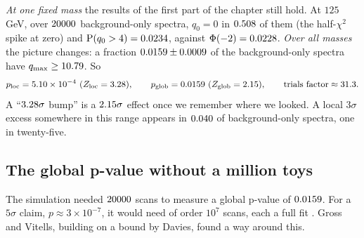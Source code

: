 \emph{At one fixed mass} the results of the first part of the chapter still
hold. At $125\,$GeV, over $20000$ background-only spectra, $q_0=0$ in
$0.508$ of them (the half-$\chi^2$ spike at zero) and
$\operatorname{P}(q_0>4)=0.0234$, against $\Phi(-2)=0.0228$. \emph{Over
all masses} the picture changes: a fraction $0.0159\pm0.0009$ of the
background-only spectra have $q_{\max}\ge10.79$. So
\[
  p_{\rm loc}=5.10\times10^{-4}\ (Z_{\rm loc}=3.28),
  \qquad
  p_{\rm glob}=0.0159\ (Z_{\rm glob}=2.15),
  \qquad
  \text{trials factor}\approx31.3 .
\]
A ``$3.28\sigma$ bump'' is a $2.15\sigma$ effect once we remember where we looked.
A local $3\sigma$ excess somewhere in this range appears in
$0.040$ of background-only spectra, one in twenty-five.

\subsection{The global p-value without a million toys}
\label{4b:sec:gross-vitells}

The simulation needed $20000$ scans to measure a global p-value of
$0.0159$. For a $5\sigma$ claim, $p\approx3\times10^{-7}$, it would need of order
$10^7$ scans, each a full fit \cite{GrossVitells2010}. Gross and Vitells, building
on a bound by Davies, found a way around this.

